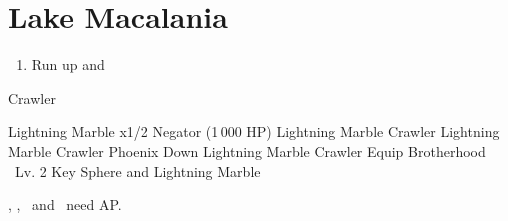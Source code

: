 \chapter{Lake Macalania}

\begin{enumerate}
    \item Run up and \sd
\end{enumerate}
\begin{battle}[16000]{Crawler}
    \begin{itemize}
        \switch{\tidus}{\rikku}
        \rikkuf Lightning Marble x1/2 Negator (1\,000 HP)
        \rikkuf Lightning Marble Crawler
        \kimahrif Lightning Marble Crawler
        \luluf Phoenix Down \rikku
        \rikkuf Lightning Marble Crawler
        \switch{\yuna}{\tidus}
        \tidusf Equip Brotherhood
        \rikkuf \od\ Lv. 2 Key Sphere and Lightning Marble
    \end{itemize}
    \tidus, \yuna, \lulu\ and \kimahri\ need AP.
\end{battle}
